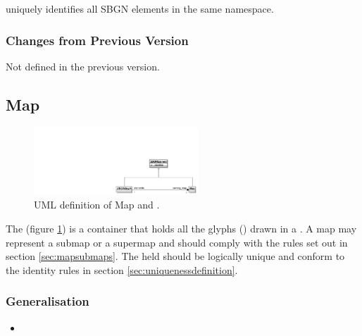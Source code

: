 \begin{attributes}
   uniquely identifies all SBGN elements in
  the same namespace.
\end{attributes}

\subsubsection{Changes from Previous Version}

Not defined in the previous version.

\subsection{Map}
\label{defn:Map}\label{sec:map}


\begin{figure}[h!]
  \centering
  \includegraphics[width=0.55\textwidth]{images/mapuml}
  \caption{UML definition of Map and .}
  \label{fig:mapuml}
\end{figure}

The  (figure \ref{fig:mapuml}) is a container that
holds all the glyphs () drawn in a \PDm. A map may
represent a submap or a supermap and should comply with the rules set
out in section \ref{sec:mapsubmaps}. The  held should be
logically unique and conform to the identity rules in section
\ref{sec:uniquenessdefinition}.


\subsubsection{Generalisation}

\begin{itemize}
\item {}
\end{itemize}

